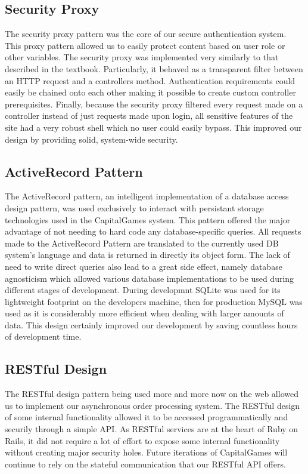 \subsection{Security Proxy}
The security proxy pattern was the core of our secure authentication system. This proxy pattern allowed us to easily protect content based on user role or other variables. The security proxy was implemented very similarly to that described in the textbook. Particularly, it behaved as a transparent filter between an HTTP request and a controllers method. Authentication requirements could easily be chained onto each other making it possible to create custom controller prerequisites. Finally, because the security proxy filtered every request made on a controller instead of just requests made upon login, all sensitive features of the site had a very robust shell which no user could easily bypass. This improved our design by providing solid, system-wide security.
\subsection{ActiveRecord Pattern}
The ActiveRecord pattern, an intelligent implementation of a database access design pattern, was used exclusively to interact with persistant storage technologies used in the CapitalGames system. This pattern offered the major advantage of not needing to hard code any database-specific queries. All requests made to the ActiveRecord Pattern are translated to the currently used DB system's language and data is returned in directly its object form. The lack of need to write direct queries also lead to a great side effect, namely database agnosticism which allowed various database implementations to be used during different stages of development. During developmnt SQLite was used for its lightweight footprint on the developers machine, then for production MySQL was used as it is considerably more efficient when dealing with larger amounts of data. This design certainly improved our development by saving countless hours of development time.
\subsection{RESTful Design}
The RESTful design pattern being used more and more now on the web allowed us to implement our asynchronous order processing system. The RESTful design of some internal functionality allowed it to be accessed programmatically and securily through a simple API. As RESTful services are at the heart of Ruby on Rails, it did not require a lot of effort to expose some internal functionality without creating major security holes. Future iterations of CapitalGames will continue to rely on the stateful communication that our RESTful API offers.
